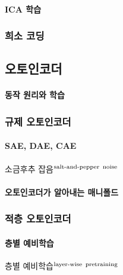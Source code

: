\documentclass [12pt] {oblivoir}
\let\oldsubsubsection=\subsubsection
\renewcommand{\subsubsection}
{
  \filbreak
  \oldsubsubsection
}
\begin{document}
\vspace{3mm}

\paragraph*{ICA 학습}\mbox{}

\vspace{3mm}

\subsubsection{희소 코딩}

\subsection{오토인코더}

\paragraph*{동작 원리와 학습}\mbox{}

\vspace{3mm}

\subsubsection{규제 오토인코더}

\paragraph*{SAE, DAE, CAE}\mbox{}

\vspace{3mm}

소금후추 잡음$^{\text{salt-and-pepper\, noise}}$

\paragraph*{오토인코더가 알아내는 매니폴드}\mbox{}

\subsubsection{적층 오토인코더}

\paragraph*{층별 예비학습}\mbox{}

층별 예비학습$^{\text{layer-wise\, pretraining}}$
\end{document}
